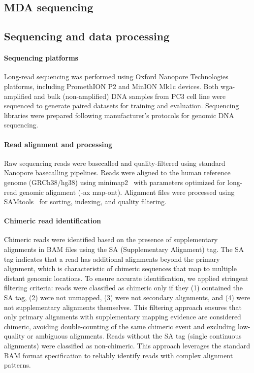 \documentclass[pdflatex,sn-nature]{sn-jnl}%
\theoremstyle{thmstyleone}%
\theoremstyle{thmstyletwo}%
\theoremstyle{thmstylethree}%
\begin{document}
\subsection*{MDA sequencing}

\subsection*{Sequencing and data processing}

\paragraph{Sequencing platforms}
Long-read sequencing was performed using Oxford Nanopore Technologies platforms, including PromethION P2 and MinION Mk1c devices.
Both \gls{wga}-amplified and bulk (non-amplified) DNA samples from PC3 cell line were sequenced to generate paired datasets for training and evaluation.
Sequencing libraries were prepared following manufacturer's protocols for genomic DNA sequencing.

\paragraph{Read alignment and processing}
Raw sequencing reads were basecalled and quality-filtered using standard Nanopore basecalling pipelines.
Reads were aligned to the human reference genome (GRCh38/hg38) using minimap2~\cite{li2018minimap2} with parameters optimized for long-read genomic alignment (-ax map-ont).
Alignment files were processed using SAMtools~\cite{danecek2021twelve} for sorting, indexing, and quality filtering.

\paragraph{Chimeric read identification}
Chimeric reads were identified based on the presence of supplementary alignments in BAM files using the SA (Supplementary Alignment) tag.
The SA tag indicates that a read has additional alignments beyond the primary alignment, which is characteristic of chimeric sequences that map to multiple distant genomic locations.
To ensure accurate identification, we applied stringent filtering criteria: reads were classified as chimeric only if they (1) contained the SA tag, (2) were not unmapped, (3) were not secondary alignments, and (4) were not supplementary alignments themselves.
This filtering approach ensures that only primary alignments with supplementary mapping evidence are considered chimeric, avoiding double-counting of the same chimeric event and excluding low-quality or ambiguous alignments.
Reads without the SA tag (single continuous alignments) were classified as non-chimeric.
This approach leverages the standard BAM format specification to reliably identify reads with complex alignment patterns.
\end{document}
